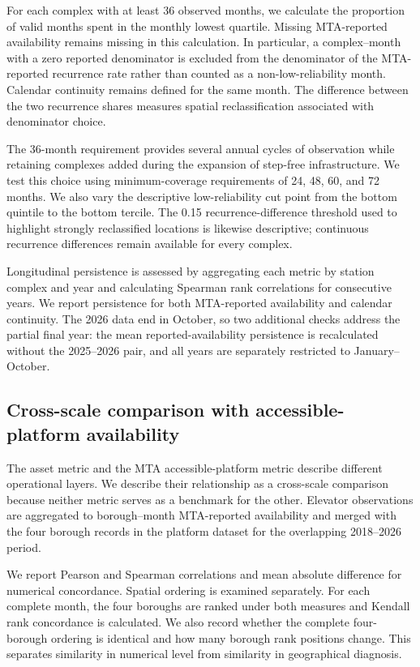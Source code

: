 For each complex with at least 36 observed months, we calculate the proportion of valid months spent in the monthly lowest quartile. Missing MTA-reported availability remains missing in this calculation. In particular, a complex--month with a zero reported denominator is excluded from the denominator of the MTA-reported recurrence rate rather than counted as a non-low-reliability month. Calendar continuity remains defined for the same month. The difference between the two recurrence shares measures spatial reclassification associated with denominator choice.

The 36-month requirement provides several annual cycles of observation while retaining complexes added during the expansion of step-free infrastructure. We test this choice using minimum-coverage requirements of 24, 48, 60, and 72 months. We also vary the descriptive low-reliability cut point from the bottom quintile to the bottom tercile. The 0.15 recurrence-difference threshold used to highlight strongly reclassified locations is likewise descriptive; continuous recurrence differences remain available for every complex.

Longitudinal persistence is assessed by aggregating each metric by station complex and year and calculating Spearman rank correlations for consecutive years. We report persistence for both MTA-reported availability and calendar continuity. The 2026 data end in October, so two additional checks address the partial final year: the mean reported-availability persistence is recalculated without the 2025--2026 pair, and all years are separately restricted to January--October.

\subsection{Cross-scale comparison with accessible-platform availability}

The asset metric and the MTA accessible-platform metric describe different operational layers. We describe their relationship as a cross-scale comparison because neither metric serves as a benchmark for the other. Elevator observations are aggregated to borough--month MTA-reported availability and merged with the four borough records in the platform dataset for the overlapping 2018--2026 period.

We report Pearson and Spearman correlations and mean absolute difference for numerical concordance. Spatial ordering is examined separately. For each complete month, the four boroughs are ranked under both measures and Kendall rank concordance is calculated. We also record whether the complete four-borough ordering is identical and how many borough rank positions change. This separates similarity in numerical level from similarity in geographical diagnosis.

